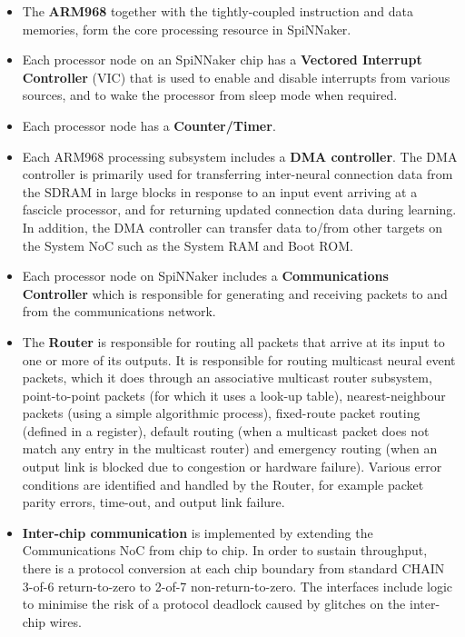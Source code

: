 \documentclass[oneside, a4paper, 11pt]{memoir}
\begin{document}
\begin{itemize}
	\setlength\itemsep{2pt}
	\item The \textbf{ARM968} together with the tightly-coupled instruction and data memories, form the core processing resource in SpiNNaker.
	\item Each processor node on an SpiNNaker chip has a \textbf{Vectored Interrupt Controller} (VIC) that is used to enable  and disable  interrupts  from  various  sources,  and  to wake  the processor  from  sleep mode when required.
	\item Each processor node has a \textbf{Counter/Timer}.
	\item Each ARM968 processing subsystem includes a \textbf{DMA controller}. The DMA controller is primarily used for transferring inter-neural connection data from the SDRAM in large blocks in response to an  input  event  arriving  at a  fascicle processor, and  for  returning updated connection data during learning. In addition, the DMA controller can transfer data to/from other targets on the System NoC such as the System RAM and Boot ROM.
	\item	Each processor node on SpiNNaker includes a \textbf{Communications Controller} which is responsible for generating and receiving packets to and from the communications network.
	\item The \textbf{Router} is responsible for routing all packets that arrive at its input to one or more of its outputs. It  is  responsible  for  routing multicast neural event packets, which  it does  through an associative multicast  router  subsystem,  point-to-point  packets  (for  which  it  uses  a  look-up  table),  nearest-neighbour packets  (using  a  simple  algorithmic process),  fixed-route packet  routing  (defined  in  a register), default routing (when a multicast packet does not match any entry in the multicast router) and emergency routing (when an output link is blocked due to congestion or hardware failure). Various error conditions are identified and handled by the Router, for example packet parity errors, time-out, and output link failure.
	\item \textbf{Inter-chip  communication}  is  implemented  by  extending  the Communications NoC  from  chip  to chip.  In  order  to  sustain  throughput,  there  is  a  protocol  conversion  at  each  chip  boundary  from standard CHAIN 3-of-6 return-to-zero to 2-of-7 non-return-to-zero. The interfaces include logic to minimise the risk of a protocol deadlock caused by glitches on the inter-chip wires.

\end{itemize}
\end{document}
